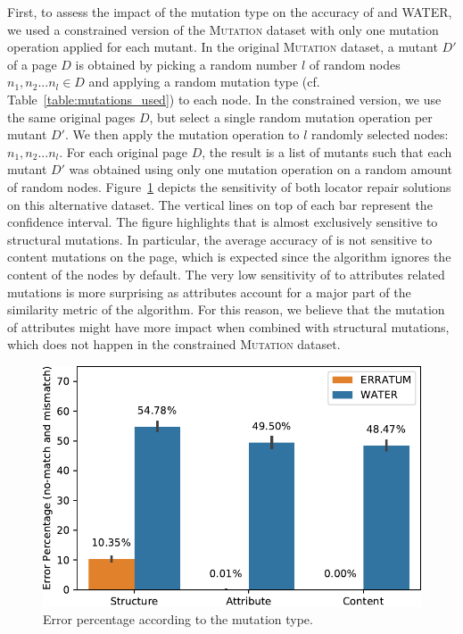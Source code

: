 First, to assess the impact of the mutation type on the accuracy of \erratum and WATER, we used a constrained version of the \textsc{Mutation} dataset with only one mutation operation applied for each mutant. 	
In the original \textsc{Mutation} dataset, a mutant $D'$ of a page $D$ is obtained by picking a random number $l$ of random nodes $n_1, n_2...n_l \in D$ and applying a random mutation type (cf. Table~\ref{table:mutations_used}) to each node.
In the constrained version, we use the same original pages $D$, but select a single random mutation operation per mutant $D'$.
We then apply the mutation operation to $l$ randomly selected nodes: $n_1, n_2...n_l$. 
For each original page $D$, the result is a list of mutants such that each mutant $D'$ was obtained using only one mutation operation on a random amount of random nodes.
Figure~\ref{fig:mutationTypeAnalysis} depicts the sensitivity of both locator repair solutions on this alternative dataset.
The vertical lines on top of each bar represent the confidence interval.
The figure highlights that \erratum is almost exclusively sensitive to structural mutations.
In particular, the average accuracy of \erratum is not sensitive to content mutations on the page, which is expected since the algorithm ignores the content of the nodes by default.
The very low sensitivity of \erratum to attributes related mutations is more surprising as attributes account for a major part of the similarity metric of the algorithm.
For this reason, we believe that the mutation of attributes might have more impact when combined with structural mutations, which does not happen in the constrained \textsc{Mutation} dataset.

\begin{figure}[]
  \centering
  \includegraphics[width=.8\linewidth]{erratum/mutationTypeAnalysis}
  \caption{Error percentage according to the mutation type.}
  \label{fig:mutationTypeAnalysis}
\end{figure}


